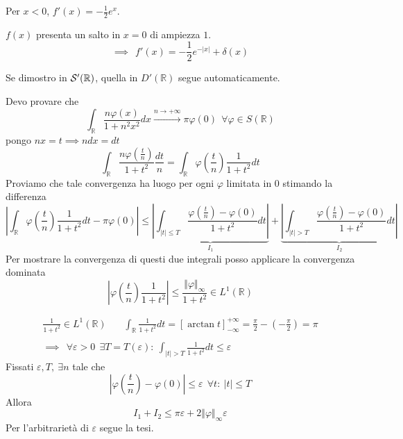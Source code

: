 Per $x< 0$, $f'( x) =-\frac{1}{2} e^{x}$.

$f( x)$ presenta un salto in $x=0$ di ampiezza $1$.
\begin{equation*}
\implies \ \ f'( x) =-\frac{1}{2} e^{-| x| } +\delta ( x)
\end{equation*}
\Soluzione


Se dimostro in $\mathcal{S}  '(\mathbb{R})$, quella in $D'(\mathbb{R})$ segue automaticamente.

Devo provare che
\begin{equation*}
\int _{\mathbb{R}}\frac{n\varphi ( x)}{1+n^{2} x^{2}} dx\xrightarrow{n\rightarrow +\infty } \pi \varphi ( 0) \ \ \forall \varphi \in S(\mathbb{R})
\end{equation*}
pongo $nx=t\implies ndx=dt$
\begin{equation*}
\int _{\mathbb{R}}\frac{n\varphi \left(\frac{t}{n}\right)}{1+t^{2}}\frac{dt}{n} =\int _{\mathbb{R}} \varphi \left(\frac{t}{n}\right)\frac{1}{1+t^{2}} dt
\end{equation*}
Proviamo che tale convergenza ha luogo per ogni $\varphi $ limitata in $0$ stimando la differenza
\begin{equation*}
\left| \int _{\mathbb{R}} \varphi \left(\frac{t}{n}\right)\frac{1}{1+t^{2}} dt-\pi \varphi ( 0)\right| \leqslant \underbrace{\left| \int _{| t| \leqslant T}\frac{\varphi \left(\frac{t}{n}\right) -\varphi ( 0)}{1+t^{2}} dt\right| }_{I_{1}} +\underbrace{\left| \int _{| t|  >T}\frac{\varphi \left(\frac{t}{n}\right) -\varphi ( 0)}{1+t^{2}} dt\right| }_{I_{2}}
\end{equation*}
Per mostrare la convergenza di questi due integrali posso applicare la convergenza dominata
\begin{equation*}
\left| \varphi \left(\frac{t}{n}\right)\frac{1}{1+t^{2}}\right| \leqslant \frac{\Vert \varphi \Vert _{\infty }}{1+t^{2}} \in L^{1}(\mathbb{R})
\end{equation*}
\begin{rem}
\begin{gather*}
\frac{1}{1+t^{2}} \in L^{1}(\mathbb{R}) \ \ \ \ \ \ \ \ \int _{\mathbb{R}}\frac{1}{1+t^{2}} dt=[\arctan t]^{+\infty }_{-\infty } =\frac{\pi }{2} -\left( -\frac{\pi }{2}\right) =\pi \\
\\
\implies \ \ \forall \varepsilon  >0\ \ \exists T=T( \varepsilon ) :\ \int _{| t|  >T}\frac{1}{1+t^{2}} dt\leqslant \varepsilon 
\end{gather*}
Fissati $\varepsilon ,T,\ \exists n$ tale che
\begin{equation*}
\left| \varphi \left(\frac{t}{n}\right) -\varphi ( 0)\right| \leqslant \varepsilon \ \ \forall t:\ | t| \leqslant T
\end{equation*}
Allora
\begin{equation*}
I_{1} +I_{2} \leqslant \pi \varepsilon +2\Vert \varphi \Vert _{\infty } \varepsilon 
\end{equation*}
Per l'arbitrarietà di $\varepsilon $ segue la tesi.
\end{rem}
\Soluzione

